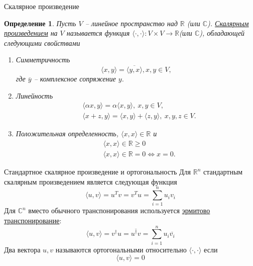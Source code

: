 \documentclass[10pt, handout]{beamer}
\newcounter{def}
\newtheorem{definition_ru}{Определение}[def]
\begin{document}
\begin{frame}{Скалярное произведение}

\begin{definition_ru}
Пусть $V$ -- линейное пространство над $\mathbb{R}$ (или $\mathbb{C}$). \underline{Скалярным произведением} на $V$ называется функция $\langle\cdot, \cdot\rangle:V\times V\rightarrow \mathbb{R}$(или $\mathbb{C}$), обладающей следующими свойствами
\begin{enumerate}
\item Симметричность
$$
\langle x,y\rangle=\overline{\langle y,x\rangle}, x,y\in V,
$$
где $\overline{y}$ -- комплексное сопряжение $y$.
\item Линейность
\begin{align*}
&\langle\alpha x,y\rangle=\alpha\langle x, y\rangle, ~x,y\in V, \\
&\langle x+z,y\rangle=\langle x, y\rangle + \langle z, y\rangle,~x,y,z\in V.
\end{align*}
\item Положительная определенность, $\langle x, x\rangle\in \mathbb{R}$ и
\begin{align*}
&\langle x, x\rangle\in \mathbb{R}\geq 0\\
&\langle x, x\rangle\in \mathbb{R}=0\Leftrightarrow x=0.
\end{align*}

\end{enumerate}
\end{definition_ru}
\end{frame}


\begin{frame}{Стандартное скалярное произведение и ортогональность}
Для $\mathbb{R}^n$ стандартным скалярным произведением является следующая функция
$$
\langle u, v\rangle=u^Tv=v^Tu=\sum_{i=1}^nu_iv_i
$$
\pause
Для $\mathbb{C}^n$ вместо обычного транспонирования используется \underline{эрмитово транспонирование}:
$$
\langle u, v\rangle=v^\dagger u=\overline{u^\dagger v}=\sum_{i=1}^n u_i\overline{v_i}
$$
\pause
Два вектора $u,v$ называются ортогональными относительно $\langle \cdot, \cdot \rangle$ если
$$
\langle u, v \rangle=0
$$
\end{frame}
\end{document}

